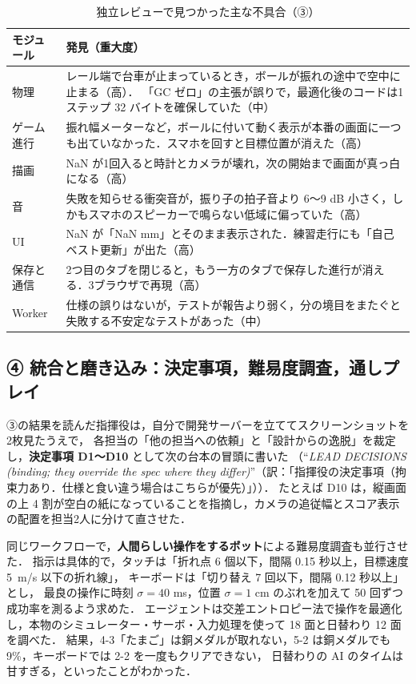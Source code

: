 \documentclass[a4paper,10pt]{ltjsarticle}
\begin{document}
\begin{table}[H]
\centering
\caption{独立レビューで見つかった主な不具合（③）}
\label{tab:review}
\small
\begin{tabularx}{\linewidth}{lX}
\toprule
モジュール & 発見（重大度） \\
\midrule
物理 & レール端で台車が止まっているとき，ボールが振れの途中で空中に止まる（高）．
「GC ゼロ」の主張が誤りで，最適化後のコードは1ステップ 32 バイトを確保していた（中） \\
ゲーム進行 & 振れ幅メーターなど，ボールに付いて動く表示が本番の画面に一つも出ていなかった．スマホを回すと目標位置が消えた（高） \\
描画 & NaN が1回入ると時計とカメラが壊れ，次の開始まで画面が真っ白になる（高） \\
音 & 失敗を知らせる衝突音が，振り子の拍子音より 6〜9 dB 小さく，しかもスマホのスピーカーで鳴らない低域に偏っていた（高） \\
UI & NaN が「NaN mm」とそのまま表示された．練習走行にも「自己ベスト更新」が出た（高） \\
保存と通信 & 2つ目のタブを閉じると，もう一方のタブで保存した進行が消える．3ブラウザで再現（高） \\
Worker & 仕様の誤りはないが，テストが報告より弱く，分の境目をまたぐと失敗する不安定なテストがあった（中） \\
\bottomrule
\end{tabularx}
\end{table}

\subsection{④ 統合と磨き込み：決定事項，難易度調査，通しプレイ}

③の結果を読んだ指揮役は，自分で開発サーバーを立ててスクリーンショットを2枚見たうえで，
各担当の「他の担当への依頼」と「設計からの逸脱」を裁定し，\textbf{決定事項 D1〜D10} として次の台本の冒頭に書いた
（``\textit{LEAD DECISIONS (binding; they override the spec where they differ)}''（訳：「指揮役の決定事項（拘束力あり．仕様と食い違う場合はこちらが優先）」））．
たとえば D10 は，縦画面の上 4 割が空白の紙になっていることを指摘し，カメラの追従幅とスコア表示の配置を担当2人に分けて直させた．

同じワークフローで，\textbf{人間らしい操作をするボット}による難易度調査も並行させた．
指示は具体的で，タッチは「折れ点 6 個以下，間隔 0.15 秒以上，目標速度 \SI{5}{m/s} 以下の折れ線」，
キーボードは「切り替え 7 回以下，間隔 0.12 秒以上」とし，
最良の操作に時刻 $\sigma = 40$ ms，位置 $\sigma = 1$ cm のぶれを加えて 50 回ずつ成功率を測るよう求めた．
エージェントは交差エントロピー法で操作を最適化し，本物のシミュレーター・サーボ・入力処理を使って 18 面と日替わり 12 面を調べた．
結果，4-3「たまご」は銅メダルが取れない，5-2 は銅メダルでも 9\%，キーボードでは 2-2 を一度もクリアできない，
日替わりの AI のタイムは甘すぎる，といったことがわかった．
\end{document}
